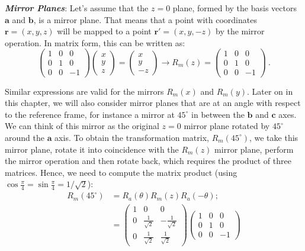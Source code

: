 \begin{itemize}
{	\item \textbf{\textit{Mirror Planes}}: Let's assume that the $z=0$ plane, formed by the basis vectors $\mathbf{a}$ and $\mathbf{b}$, is a mirror plane.  That means that a point with coordinates $\mathbf{r}=(x,y,z)$ will be mapped to a point $\mathbf{r}'=(x,y,-z)$ by the mirror operation.  In matrix form, this can be written as:
	\[
	\begin{pmatrix}1&0&0\\ 0&1&0\\ 0&0&-1\end{pmatrix}\begin{pmatrix}x\\ y\\ z\end{pmatrix} = \begin{pmatrix}x\\ y\\ -z\end{pmatrix}\rightarrow 
	R_m(z) = \begin{pmatrix}1&0&0\\ 0&1&0\\ 0&0&-1\end{pmatrix}\ .
	\]}
	Similar expressions are valid for the mirrors $R_m(x)$ and $R_m(y)$. Later on in this chapter, we will also consider mirror planes that are at an angle with respect to the reference frame, for instance a mirror at $45^{\circ}$ in between the $\mathbf{b}$ and $\mathbf{c}$ axes. We can think of this mirror as the original $z=0$ mirror plane rotated by $45^{\circ}$ around the $\mathbf{a}$ axis.  To obtain the transformation matrix, $R_m(45^{\circ})$, we take this mirror plane, rotate it into coincidence with the $R_m(z)$ mirror plane, perform the mirror operation and then rotate back, which requires the product of three matrices.  Hence, we need to compute the matrix product (using $\cos\frac{\pi}{4}=\sin\frac{\pi}{4}=1/\sqrt{2}$):
\begin{equation*}
\begin{split}
		R_m(45^{\circ}) &= R_a(\theta) R_m(z) R_a(-\theta); \\
		&= 
		\begin{pmatrix}1&0&0\\ 0&\frac{1}{\sqrt{2}}&-\frac{1}{\sqrt{2}}\\ 0&\frac{1}{\sqrt{2}}&\frac{1}{\sqrt{2}}\end{pmatrix}
		\begin{pmatrix}1&0&0\\ 0&1&0\\ 0&0&-1\end{pmatrix}

\end{split}
\end{equation*}
\end{itemize}
